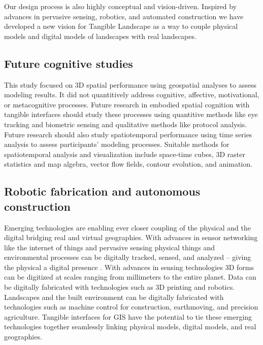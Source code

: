 \documentclass[prodmode,acmtochi]{acmsmall} %
\begin{document}
Our design process is also highly conceptual and vision-driven. 
Inspired by 
advances in pervasive sensing, robotics, and automated construction
we have developed a new vision for Tangible Landscape 
as a way to couple 
physical models and digital models of landscapes 
with real landscapes.

\subsection{Future cognitive studies}
\label{cog_sci}
%
This study focused on 3D spatial performance
using geospatial analyses to assess modeling results. 
%
It did not quantitively address 
cognitive, affective, motivational, or metacognitive processes. 
%
Future research in embodied spatial cognition with tangible interfaces 
should study these processes using quantitive methods like 
eye tracking and biometric sensing 
and qualitative methods like protocol analysis.  
%
Future research should also study spatiotemporal performance
using time series analysis to assess participants' modeling processes.
%
Suitable methods for spatiotemporal analysis and visualization include 
space-time cubes, 3D raster statistics and map algebra, 
vector flow fields, contour evolution, and animation.

\subsection{Robotic fabrication and autonomous construction}
\label{robotic_fab}
%
Emerging technologies are enabling ever closer coupling 
of the physical and the digital 
bridging real and virtual geographies. 
%
With advances in sensor networking like 
the internet of things and pervasive sensing 
physical things and environmental processes
can be digitally tracked, sensed, and analyzed  
-- giving the physical a digital presence \cite{Ratti2009,Resch2011}. 
%
With advances in sensing technologies
3D forms can be digitized at scales ranging from millimeters to the entire planet.
%
Data can be digitally fabricated with technologies such as 3D printing and robotics. 
%
Landscapes and the built environment can be digitally fabricated 
with technologies such as machine control 
for construction, earthmoving, and precision agriculture.
%
Tangible interfaces for GIS have the potential to 
tie these emerging technologies together 
seamlessly linking physical models, digital models, and real geographies. 
\end{document}
